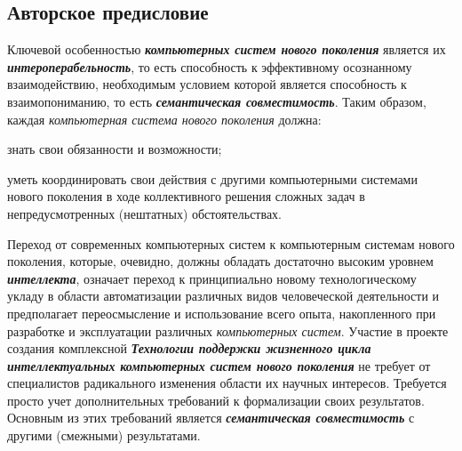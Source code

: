 \begin{partbacktext}
\part*{Авторское предисловие}
\label{chap_preface_auth}

Ключевой особенностью \textbf{\textit{компьютерных систем нового поколения}} является их \textbf{\textit{интероперабельность}}, то есть способность к эффективному осознанному взаимодействию, необходимым условием которой является способность к взаимопониманию, то есть \textbf{\textit{семантическая совместимость}}. Таким образом, каждая \textit{компьютерная система нового поколения} должна:

\begin{textitemize}
	\item знать свои обязанности и возможности;
	\item уметь координировать свои действия с другими компьютерными системами нового поколения в ходе коллективного решения сложных задач в непредусмотренных (нештатных) обстоятельствах.
\end{textitemize}

Переход от современных компьютерных систем к компьютерным системам нового поколения, которые, очевидно, должны обладать достаточно высоким уровнем \textbf{\textit{интеллекта}}, означает переход к принципиально новому технологическому укладу в области автоматизации различных видов человеческой деятельности и предполагает переосмысление и использование всего опыта, накопленного при разработке и эксплуатации различных \textit{компьютерных систем}. Участие в проекте создания комплексной \textbf{\textit{Технологии поддержки жизненного цикла интеллектуальных компьютерных систем нового поколения}} не требует от специалистов радикального изменения области их научных интересов. Требуется просто учет дополнительных требований к формализации своих результатов. Основным из этих требований является \textbf{\textit{семантическая совместимость}} с другими (смежными) результатами.

\begin{comment}
	
К настоящему моменту 
\begin{textitemize}
	\item Завершен первый этап разработки \textit{Технологии поддержки жизненного цикла интеллектуальных компьютерных систем нового поколения}, которая названа нами \textbf{\textit{Технологией OSTIS}} (Open Semantic Technology for Intelligent Systems). Началом указанного первого этапа является Первая конференция OSTIS (Минск, 10 -- 12 февраля 2011 года).
	\item Сформировался работоспособный стартовый авторский коллектив в рамках созданного Учебно-научного объединения по Искусственному интеллекту, в состав которого входят ведущие университеты Республики Беларусь (в четырех из которых открыта специальность ``Искусственный интеллект''), и ряд других организаций.
\end{textitemize}


\end{comment}
\end{partbacktext}
